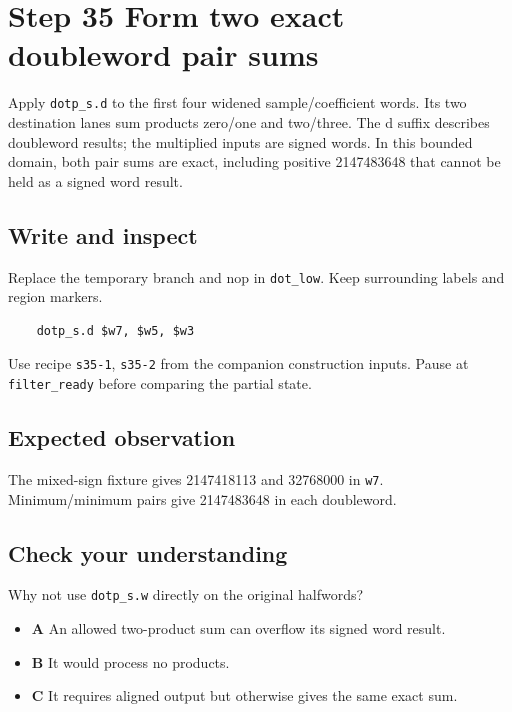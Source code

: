 \section{Step 35 Form two exact doubleword pair sums}\label{fir-s35}

Apply \texttt{dotp\_s.d} to the first four widened sample/coefficient words. Its two destination lanes sum products zero/one and two/three. The d suffix describes doubleword results; the multiplied inputs are signed words. In this bounded domain, both pair sums are exact, including positive 2147483648 that cannot be held as a signed word result.

\subsection{Write and inspect}
Replace the temporary branch and nop in \texttt{dot\_low}. Keep surrounding labels and region markers.

\begin{verbatim}
    dotp_s.d $w7, $w5, $w3
\end{verbatim}
Use recipe \texttt{s35-1}, \texttt{s35-2} from the companion construction inputs. Pause at \texttt{filter\_ready} before comparing the partial state.

\subsection{Expected observation}
The mixed-sign fixture gives 2147418113 and 32768000 in \texttt{w7}. Minimum/minimum pairs give 2147483648 in each doubleword.

\subsection{Check your understanding}
Why not use \texttt{dotp\_s.w} directly on the original halfwords?

\begin{itemize}
  \item \textbf{A} An allowed two-product sum can overflow its signed word result.
  \item \textbf{B} It would process no products.
  \item \textbf{C} It requires aligned output but otherwise gives the same exact sum.
\end{itemize}
